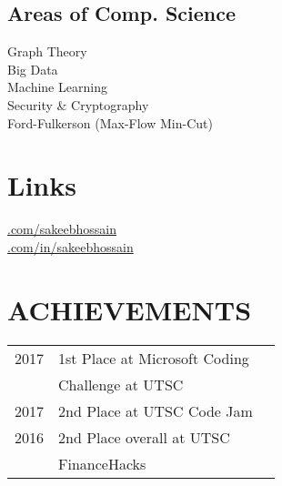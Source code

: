 \documentclass[]{deedy-resume-openfont}
\begin{document}
\begin{minipage}[t]{0.33\textwidth}
\subsection{Areas of Comp. Science}
Graph Theory \\
Big Data\\
Machine Learning \\
Security \& Cryptography \\
Ford-Fulkerson (Max-Flow Min-Cut)
\sectionsep


\section{Links} 
\href{https://github.com/sakeebhossain}{.com/sakeebhossain} \\
\href{https://www.linkedin.com/in/sakeebhossain}{.com/in/sakeebhossain} \\
\sectionsep


\section{ACHIEVEMENTS} 
\begin{tabular}{rll}
2017	     & 1st Place at Microsoft Coding\\
             & Challenge at UTSC\\
2017	     & 2nd Place at UTSC Code Jam \\
2016	     & 2nd Place overall at UTSC\\ 
             & FinanceHacks\\

\end{tabular}
\sectionsep


%
%

\end{minipage} 
\hfill
\end{document}
